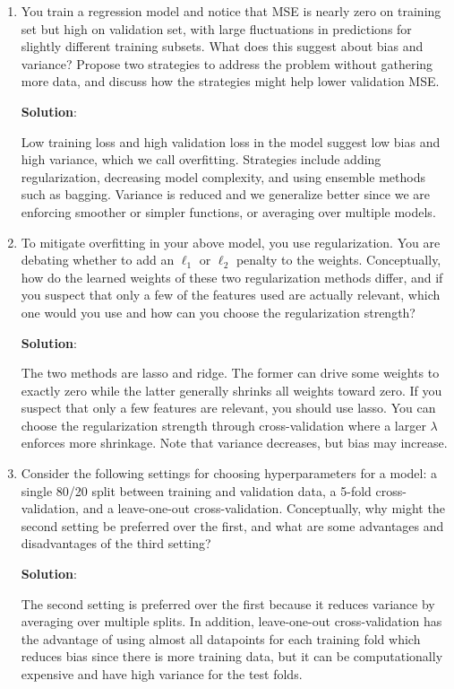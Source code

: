\documentclass[11pt, letterpaper]{article}
\theoremstyle{definition}
\theoremstyle{plain}
\newenvironment{solution}{
    \vspace{2mm}
    \color{blue}\noindent\textbf{Solution}:
}{}
\begin{document}
\begin{mdframed}
    \begin{enumerate}
        \item You train a regression model and notice that MSE is nearly zero on training set but high on validation set, with large fluctuations in predictions for slightly different training subsets. What does this suggest about bias and variance? Propose two strategies to address the problem without gathering more data, and discuss how the strategies might help lower validation MSE.
        
        \begin{solution}
            Low training loss and high validation loss in the model suggest low bias and high variance, which we call overfitting. Strategies include adding regularization, decreasing model complexity, and using ensemble methods such as bagging. Variance is reduced and we generalize better since we are enforcing smoother or simpler functions, or averaging over multiple models.
        \end{solution}

        \item To mitigate overfitting in your above model, you use regularization. You are debating whether to add an $\ell_1$ or $\ell_2$ penalty to the weights. Conceptually, how do the learned weights of these two regularization methods differ, and if you suspect that only a few of the features used are actually relevant, which one would you use and how can you choose the regularization strength?
        
        \begin{solution}
            The two methods are lasso and ridge. The former can drive some weights to exactly zero while the latter generally shrinks all weights toward zero. If you suspect that only a few features are relevant, you should use lasso. You can choose the regularization strength through cross-validation where a larger $\lambda$ enforces more shrinkage. Note that variance decreases, but bias may increase.
        \end{solution}

        \item Consider the following settings for choosing hyperparameters for a model: a single 80/20 split between training and validation data, a 5-fold cross-validation, and a leave-one-out cross-validation. Conceptually, why might the second setting be preferred over the first, and what are some advantages and disadvantages of the third setting?
        
        \begin{solution}
            The second setting is preferred over the first because it reduces variance by averaging over multiple splits. In addition, leave-one-out cross-validation has the advantage of using almost all datapoints for each training fold which reduces bias since there is more training data, but it can be computationally expensive and have high variance for the test folds.
        \end{solution}

    \end{enumerate}
\end{mdframed}
\end{document}
